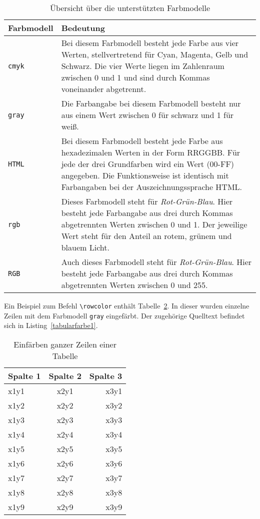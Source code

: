 \begin{table}[h!tb]
\centering
\caption{Übersicht über die unterstützten Farbmodelle}
\label{Tabelle_Farbmodelle}       %
\begin{tabularx}{\textwidth}{lX}
\hline
Farbmodell & Bedeutung\\
\hline
\texttt{cmyk}\index{CMYK} & Bei diesem Farbmodell besteht jede Farbe aus vier Werten, stellvertretend für Cyan, Magenta, Gelb und Schwarz. Die vier Werte liegen im Zahlenraum zwischen 0 und 1 und sind durch Kommas voneinander abgetrennt. \\
\hline
\texttt{gray} & Die Farbangabe bei diesem Farbmodell besteht nur aus einem Wert zwischen
0 für schwarz und 1 für weiß.\\
\hline
\texttt{HTML}\index{HTML} & Bei diesem Farbmodell besteht jede Farbe aus hexadezimalen Werten in der Form RRGGBB. Für jede der drei Grundfarben wird ein Wert (00-FF) angegeben. Die Funktionsweise ist identisch mit Farbangaben bei der Auszeichnungssprache HTML. \\
\hline
\texttt{rgb} & Dieses Farbmodell steht für \textsl{Rot-Grün-Blau}. Hier besteht jede Farbangabe aus drei durch Kommas abgetrennten Werten zwischen 0 und 1. 
Der jeweilige Wert steht für den Anteil an rotem, grünem und blauem Licht.\\
\hline
\texttt{RGB}\index{RGB} & Auch dieses Farbmodell steht für \textsl{Rot-Grün-Blau}. Hier besteht jede Farbangabe aus drei durch Kommas abgetrennten Werten zwischen 0 und 255. \\
\hline
\end{tabularx}
\end{table}


Ein Beispiel zum Befehl \verb!\rowcolor! enthält Tabelle~\ref{Tabelle_Farbige_Zeilen1}. In dieser wurden einzelne Zeilen mit dem Farbmodell \verb!gray! eingefärbt. Der zugehörige Quelltext befindet sich in Listing~\ref{tabularfarbe1}.  


\begin{table}[htb]
\centering
\caption{Einfärben ganzer Zeilen einer Tabelle}
\label{Tabelle_Farbige_Zeilen1}
\begin{tabular}{lcr}
\hline
Spalte 1 & Spalte 2 & Spalte 3 \\
\hline\hline
\rowcolor[gray]{0.9} x1y1 & x2y1 & x3y1 \\
\rowcolor[gray]{0.8} x1y2 & x2y2 & x3y2 \\
\rowcolor[gray]{0.7} x1y3 & x2y3 & x3y3 \\
\rowcolor[gray]{0.6} x1y4 & x2y4 & x3y4 \\
\rowcolor[gray]{0.5} x1y5 & x2y5 & x3y5 \\
\rowcolor[gray]{0.4} x1y6 & x2y6 & x3y6 \\
\rowcolor[gray]{0.3} x1y7 & x2y7 & x3y7 \\
\rowcolor[gray]{0.2} x1y8 & x2y8 & x3y8 \\
\rowcolor[gray]{0.1} x1y9 & x2y9 & x3y9 \\
\hline
\end{tabular}
\end{table}





